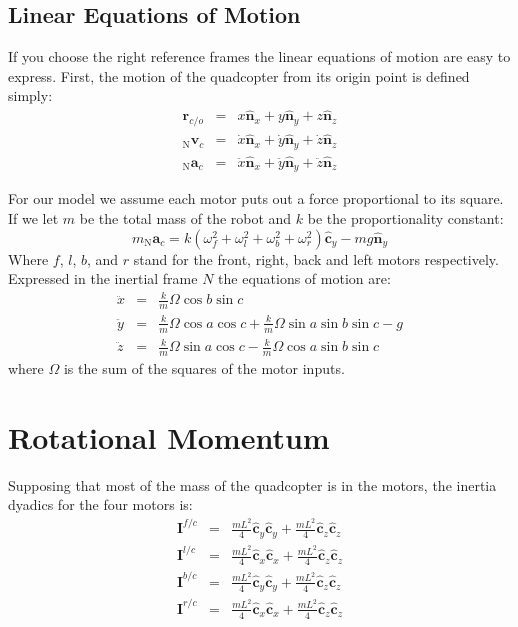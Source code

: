 \documentclass[lettersize,journal]{IEEEtran}
\begin{document}
\subsection{Linear Equations of Motion}
If you choose the right reference frames the linear equations of motion are easy to express. First, the motion of the quadcopter from its origin point is defined simply:
\begin{eqnarray}
  \mathbf{r}_{c/o} &=& x \mathbf{\hat{n}}_x + y \mathbf{\hat{n}}_y + z \mathbf{\hat{n}}_z \\
  {_\mathrm{N}\mathbf{v}_c} &=& \dot{x} \mathbf{\hat{n}}_x + \dot{y} \mathbf{\hat{n}}_y + \dot{z} \mathbf{\hat{n}}_z \\
  {_\mathrm{N}\mathbf{a}_c} &=& \ddot{x} \mathbf{\hat{n}}_x + \ddot{y} \mathbf{\hat{n}}_y + \ddot{z} \mathbf{\hat{n}}_z
\end{eqnarray}

For our model we assume each motor puts out a force proportional to its square. If we let $m$ be the total mass of the robot and $k$ be the proportionality constant:
\begin{equation}
  m{_\mathrm{N}\mathbf{a}_c} = k \left(\omega_f^2 + \omega_l^2 + \omega_b^2 + \omega_r^2\right) \mathbf{\hat{c}}_y - mg \mathbf{\hat{n}}_y
\end{equation}
Where $f$, $l$, $b$, and $r$ stand for the front, right, back and left motors respectively. Expressed in the inertial frame $N$ the equations of motion are:
\begin{eqnarray}
  \ddot{x} &=& \frac{k}{m} \Omega \cos b \sin c \\
  \ddot{y} &=& \frac{k}{m} \Omega \cos a \cos c + \frac{k}{m} \Omega \sin a \sin b \sin c - g\\
  \ddot{z} &=& \frac{k}{m} \Omega \sin a \cos c - \frac{k}{m} \Omega \cos a \sin b \sin c 
\end{eqnarray}
where $\Omega$ is the sum of the squares of the motor inputs.



\section{Rotational Momentum}
Supposing that most of the mass of the quadcopter is in the motors, the inertia dyadics for the four motors is:
\begin{eqnarray}
  \mathbf{I}^{f/c} &=& \frac{mL^2}{4} \mathbf{\hat{c}}_y\mathbf{\hat{c}}_y + \frac{mL^2}{4} \mathbf{\hat{c}}_z \mathbf{\hat{c}}_z \\
  \mathbf{I}^{l/c} &=& \frac{mL^2}{4} \mathbf{\hat{c}}_x\mathbf{\hat{c}}_x + \frac{mL^2}{4} \mathbf{\hat{c}}_z \mathbf{\hat{c}}_z \\
  \mathbf{I}^{b/c} &=& \frac{mL^2}{4} \mathbf{\hat{c}}_y\mathbf{\hat{c}}_y + \frac{mL^2}{4} \mathbf{\hat{c}}_z \mathbf{\hat{c}}_z \\
  \mathbf{I}^{r/c} &=& \frac{mL^2}{4} \mathbf{\hat{c}}_x\mathbf{\hat{c}}_x + \frac{mL^2}{4} \mathbf{\hat{c}}_z \mathbf{\hat{c}}_z
\end{eqnarray}
\end{document}
